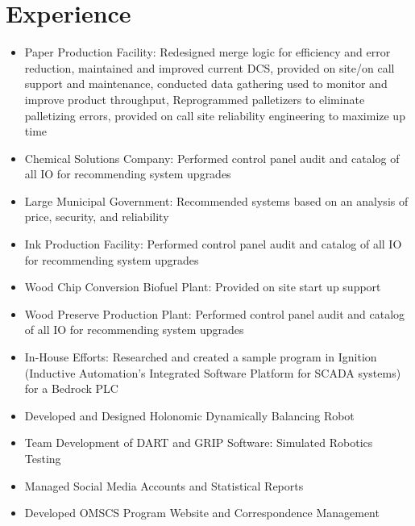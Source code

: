 \documentclass[11pt,letterpaper,sans]{moderncv}        %
\begin{document}
\makecvtitle

\vspace{-10mm}

\section{Experience}

\begin{itemize}
\item Paper Production Facility: Redesigned merge logic for efficiency and error reduction, maintained and improved current DCS, provided on site/on call support and maintenance, conducted data gathering used to monitor and improve product throughput, Reprogrammed palletizers to eliminate palletizing errors, provided on call site reliability engineering to maximize up time
\item Chemical Solutions Company: Performed control panel audit and catalog of all IO for recommending system upgrades
\item Large Municipal Government: Recommended systems based on an analysis of price, security, and reliability
\item Ink Production Facility: Performed control panel audit and catalog of all IO for recommending system upgrades
\item Wood Chip Conversion Biofuel Plant: Provided on site start up support
\item Wood Preserve Production Plant: Performed control panel audit and catalog of all IO for recommending system upgrades
\item In-House Efforts: Researched and created a sample program in Ignition (Inductive Automation’s Integrated Software Platform for SCADA systems) for a Bedrock PLC
\end{itemize}

\begin{itemize}
\item Developed and Designed Holonomic Dynamically Balancing Robot
\item Team Development of DART and GRIP Software: Simulated Robotics Testing
\end{itemize}

\begin{itemize}
\item Managed Social Media Accounts and Statistical Reports
\item Developed OMSCS Program Website and Correspondence Management
\end{itemize}
\end{document}
